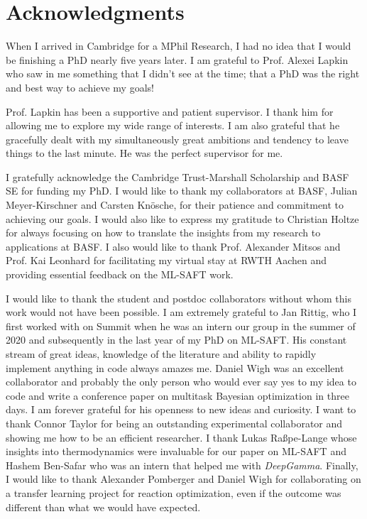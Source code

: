 
\chapter*{Acknowledgments}
When I arrived in Cambridge for a MPhil Research, I had no idea that I would be finishing  a PhD nearly five years later. I am grateful to Prof. Alexei Lapkin who saw in me something that I didn't see at the time; that a PhD was the right and best way to achieve my goals!

Prof. Lapkin has been a supportive and patient supervisor. I thank him for allowing me to explore my wide range of interests. I am also grateful that he gracefully dealt with my simultaneously great ambitions and tendency to leave things to the last minute. He was the perfect supervisor for me.

I gratefully acknowledge the Cambridge Trust-Marshall Scholarship and BASF SE for funding my PhD. I would like to thank my collaborators at BASF, Julian Meyer-Kirschner and Carsten Kn\"osche, for their patience and commitment to achieving our goals. I would also like to express my gratitude to Christian Holtze for always focusing on how to translate the insights from my research to applications at BASF. I also would like to thank Prof. Alexander Mitsos and Prof. Kai Leonhard for facilitating my virtual stay at RWTH Aachen and providing essential feedback on the ML-SAFT work. 

I would like to thank the student and postdoc collaborators without whom this work would not have been possible. I am extremely grateful to Jan Rittig, who I first worked with on Summit when he was an intern our group in the summer of 2020 and subsequently in the last year of my PhD on ML-SAFT. His constant stream of great ideas, knowledge of the literature and ability to rapidly implement anything in code always amazes me. Daniel Wigh was an excellent collaborator and probably the only person who would ever say yes to my idea to code and write a conference paper on multitask Bayesian optimization in three days. I am forever grateful for his openness to new ideas and curiosity. I want to thank Connor Taylor for being an outstanding experimental collaborator and showing me how to be an efficient researcher. I thank Lukas Ra{\ss}pe-Lange whose insights into thermodynamics were invaluable for our paper on ML-SAFT and Hashem Ben-Safar who was an intern that helped me with \textit{DeepGamma}. Finally, I would like to thank Alexander Pomberger and Daniel Wigh for collaborating on a transfer learning project for reaction optimization, even if the outcome was different
than what we would have expected.

